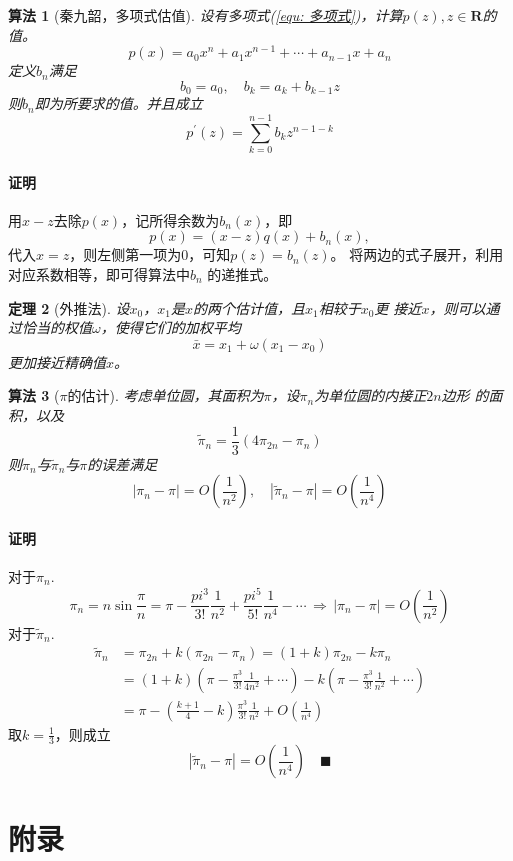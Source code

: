 \documentclass[12pt, a4paper]{article}
\theoremstyle{margin}
\newtheorem{thm}{定理}
\newtheorem{alg}[thm]{算法}
\newcommand{\R}{\mathbf{R}}
\newcommand\equref[1]{(\ref{#1})}
\newcommand{\proof}{\paragraph{证明}}
\begin{document}
  \begin{alg}[秦九韶，多项式估值]
    设有多项式\equref{equ: 多项式}，计算$p(z), z\in\R$的值。
    \begin{equation}
      \label{equ: 多项式}
      p(x) = a_0x^n + a_1x^{n-1} + \cdots + a_{n-1}x + a_n
    \end{equation}
    定义$b_n$满足
    \[
      b_0 = a_0, \quad b_k = a_k + b_{k-1}z
    \]
    则$b_n$即为所要求的值。并且成立
    \[
      p^{\prime}(z) = \sum_{k=0}^{n-1}b_kz^{n-1-k}
    \]
  \end{alg}
  \proof
    用$x-z$去除$p(x)$，记所得余数为$b_n(x)$，即
    \[
      p(x) = (x-z)q(x) + b_n(x),
    \]
    代入$x=z$，则左侧第一项为$0$，可知$p(z) = b_n(z)$。
    将两边的式子展开，利用对应系数相等，即可得算法中$b_n$
    的递推式。

  \begin{thm}[外推法]
    设$x_0$，$x_1$是$x$的两个估计值，且$x_1$相较于$x_0$更
    接近$x$，则可以通过恰当的权值$\omega$，使得它们的加权平均
    \[
      \bar{x} = x_1 + \omega(x_1-x_0)
    \]
    更加接近精确值$x$。
  \end{thm}

  \begin{alg}[$\pi$的估计]
    考虑单位圆，其面积为$\pi$，设$\pi_n$为单位圆的内接正$2n$边形
    的面积，以及
    \[
      \widetilde{\pi}_n = \frac{1}{3}(4\pi_{2n}-\pi_n)
    \]
    则$\pi_n$与$\widetilde{\pi}_n$与$\pi$的误差满足
    \[
      |\pi_n - \pi| = O(\frac{1}{n^2}), \quad
      |\widetilde{\pi}_n - \pi| = O(\frac{1}{n^4})
    \]
  \end{alg}
  \proof
    对于$\pi_n$.
    \[
      \pi_n=n\sin\frac{\pi}{n} =
      \pi - \frac{pi^3}{3!}\frac{1}{n^2} +
      \frac{pi^5}{5!}\frac{1}{n^4} - \cdots
      \,\Rightarrow \, |\pi_n - \pi| = O(\frac{1}{n^2})
    \]
    对于$\widetilde{\pi}_n$.
    \[\begin{split}
      \widetilde{\pi}_n & = \pi_{2n} + k(\pi_{2n} - \pi_n)
      = (1+k)\pi_{2n} - k\pi_n \\
      & = (1+k)(\pi - \frac{\pi^3}{3!}\frac{1}{4n^2} + \cdots)
      - k(\pi - \frac{\pi^3}{3!}\frac{1}{n^2} + \cdots) \\
      & = \pi - (\frac{k+1}{4} - k)\frac{\pi^3}{3!}\frac{1}{n^2}
      + O(\frac{1}{n^4})
    \end{split}\]
    取$k=\frac{1}{3}$，则成立
    \[
      |\widetilde{\pi}_n - \pi| = O(\frac{1}{n^4})
      \quad\blacksquare
    \]

\newpage
\section{附录}
\end{document}

